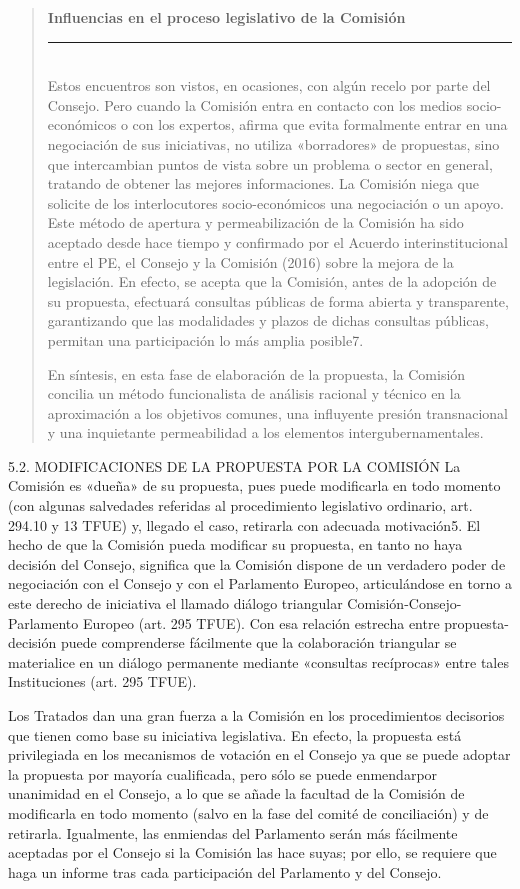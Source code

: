 \documentclass[10pt,a4paper]{article}
\newenvironment{specialblock}[1]{%
      \begin{quote} %
      \small %
      \noindent\textbf{#1}\\[-0.3em] %
      \rule{\linewidth}{0.4pt}\\[0.6em]}{
      \end{quote}}
\begin{document}
\begin{specialblock}{\textbf{Influencias en el proceso legislativo de la Comisión}}
Estos encuentros son vistos, en ocasiones, con algún recelo por parte del Consejo. Pero cuando la Comisión entra en contacto con los medios socio-económicos o con los expertos, afirma que evita formalmente entrar en una negociación de sus iniciativas, no utiliza «borradores» de propuestas, sino que intercambian puntos de vista sobre un problema o sector en general, tratando de obtener las mejores informaciones. La Comisión niega que solicite de los interlocutores socio-económicos una negociación o un apoyo. Este método de apertura y permeabilización de la Comisión ha sido aceptado desde hace tiempo y confirmado por el Acuerdo interinstitucional entre el PE, el Consejo y la Comisión (2016) sobre la mejora de la legislación. En efecto, se acepta que la Comisión, antes de la adopción de su propuesta, efectuará consultas públicas de forma abierta y transparente, garantizando que las modalidades y plazos de dichas consultas públicas, permitan una participación lo más amplia posible7.

En síntesis, en esta fase de elaboración de la propuesta, la Comisión concilia un método funcionalista de análisis racional y técnico en la aproximación a los objetivos comunes, una influyente presión transnacional y una inquietante permeabilidad a los elementos intergubernamentales.
\end{specialblock}


5.2. MODIFICACIONES DE LA PROPUESTA POR LA COMISIÓN 
La Comisión es «dueña» de su propuesta, pues puede modificarla en todo momento (con algunas salvedades referidas al procedimiento legislativo ordinario, art. 294.10 y 13 TFUE) y, llegado el caso, retirarla con adecuada motivación5. El hecho de que la Comisión pueda modificar su propuesta, en tanto no haya decisión del Consejo, significa que la Comisión dispone de un verdadero poder de negociación con el Consejo y con el Parlamento Europeo, articulándose en torno a este derecho de iniciativa el llamado diálogo triangular Comisión-Consejo-Parlamento Europeo (art. 295 TFUE). Con esa relación estrecha entre propuesta-decisión puede comprenderse fácilmente que la colaboración triangular se materialice en un diálogo permanente mediante «consultas recíprocas» entre tales Instituciones (art. 295 TFUE).

Los Tratados dan una gran fuerza a la Comisión en los procedimientos decisorios que tienen como base su iniciativa legislativa. En efecto, la propuesta está privilegiada en los mecanismos de votación en el Consejo ya que se puede adoptar la propuesta por mayoría cualificada, pero sólo se puede enmendarpor unanimidad en el Consejo, a lo que se añade la facultad de la Comisión de modificarla en todo momento (salvo en la fase del comité de conciliación) y de retirarla. Igualmente, las enmiendas del Parlamento serán más fácilmente aceptadas por el Consejo si la Comisión las hace suyas; por ello, se requiere que haga un informe tras cada participación del Parlamento y del Consejo.
\end{document}
